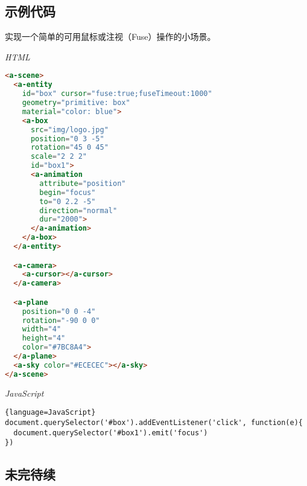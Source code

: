 \subsection{示例代码}
实现一个简单的可用鼠标或注视（Fuse）操作的小场景。


\emph{HTML}
\begin{lstlisting}[language=HTML]
<a-scene>
  <a-entity
    id="box" cursor="fuse:true;fuseTimeout:1000"
    geometry="primitive: box"
    material="color: blue">
    <a-box
      src="img/logo.jpg"
      position="0 3 -5"
      rotation="45 0 45"
      scale="2 2 2"
      id="box1">
      <a-animation
        attribute="position"
        begin="focus"
        to="0 2.2 -5"
        direction="normal"
        dur="2000">
      </a-animation>
    </a-box>
  </a-entity>

  <a-camera>
    <a-cursor></a-cursor>
  </a-camera>

  <a-plane 
    position="0 0 -4" 
    rotation="-90 0 0" 
    width="4" 
    height="4" 
    color="#7BC8A4">
  </a-plane>
  <a-sky color="#ECECEC"></a-sky>
</a-scene>
\end{lstlisting} 

\emph{JavaScript}
\begin{lstlisting}{language=JavaScript}
document.querySelector('#box').addEventListener('click', function(e){
  document.querySelector('#box1').emit('focus')
})
\end{lstlisting}

\subsection{未完待续}